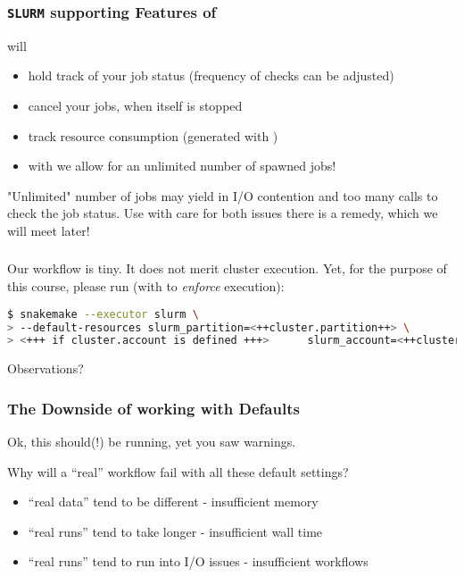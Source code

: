 \begin{frame}[fragile]
  \frametitle{\texttt{SLURM} supporting Features of \Snakemake{}}
  \Snakemake{} will
  \begin{itemize}[<+->]
   \item hold track of your job status (frequency of checks can be adjusted)
   \item cancel your jobs, when itself is stopped
   \item track resource consumption (generated with )
   \item with  we allow for an unlimited number of spawned jobs!
  \end{itemize}
  \pause
  \begin{warning}
  	"Unlimited" number of jobs may yield in I/O contention and too many calls to check the job status. Use with care for both issues there is a remedy, which we will meet later!
  \end{warning}
\end{frame}

\begin{frame}[fragile]
  \frametitle{}
  Our workflow is {\tiny tiny}. It does not merit cluster execution. Yet, for the purpose of this course, please run (with  to \emph{enforce} execution):
  \begin{lstlisting}[language=Bash, style=Shell, basicstyle=\footnotesize]
$ snakemake --executor slurm \
> --default-resources slurm_partition=<++cluster.partition++> \
> <+++ if cluster.account is defined +++>      slurm_account=<++cluster.account++><+++ endif +++> -j unlimited @-F@
  \end{lstlisting}
  \begin{question}
  	Observations?
  \end{question}
\end{frame}

\begin{frame}
  \frametitle{The Downside of working with Defaults}
  Ok, this should(!) be running, yet you saw warnings. 
  \begin{question}
  	Why will a ``real'' workflow fail with all these default settings?
  \end{question}
  \pause
  \begin{itemize}
   \item ``real data'' tend to be different - insufficient memory
   \item ``real runs'' tend to take longer - insufficient wall time
   \item ``real runs'' tend to run into I/O issues - insufficient workflows
  \end{itemize}
\end{frame}


